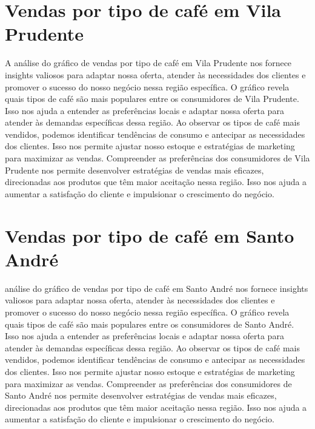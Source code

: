 \section{Vendas por tipo de café em Vila Prudente}
A análise do gráfico de vendas por tipo de café em Vila Prudente nos fornece insights valiosos para adaptar nossa oferta, atender às necessidades dos clientes e promover o sucesso do nosso negócio nessa região específica.
O gráfico revela quais tipos de café são mais populares entre os consumidores de Vila Prudente. Isso nos ajuda a entender as preferências locais e adaptar nossa oferta para atender às demandas específicas dessa região.
Ao observar os tipos de café mais vendidos, podemos identificar tendências de consumo e antecipar as necessidades dos clientes. Isso nos permite ajustar nosso estoque e estratégias de marketing para maximizar as vendas.
Compreender as preferências dos consumidores de Vila Prudente nos permite desenvolver estratégias de vendas mais eficazes, direcionadas aos produtos que têm maior aceitação nessa região. Isso nos ajuda a aumentar a satisfação do cliente e impulsionar o crescimento do negócio.

\section{Vendas por tipo de café em Santo André }
 análise do gráfico de vendas por tipo de café em Santo André nos fornece insights valiosos para adaptar nossa oferta, atender às necessidades dos clientes e promover o sucesso do nosso negócio nessa região específica.
O gráfico revela quais tipos de café são mais populares entre os consumidores de Santo André. Isso nos ajuda a entender as preferências locais e adaptar nossa oferta para atender às demandas específicas dessa região.
Ao observar os tipos de café mais vendidos, podemos identificar tendências de consumo e antecipar as necessidades dos clientes. Isso nos permite ajustar nosso estoque e estratégias de marketing para maximizar as vendas.
Compreender as preferências dos consumidores de Santo André nos permite desenvolver estratégias de vendas mais eficazes, direcionadas aos produtos que têm maior aceitação nessa região. Isso nos ajuda a aumentar a satisfação do cliente e impulsionar o crescimento do negócio.

